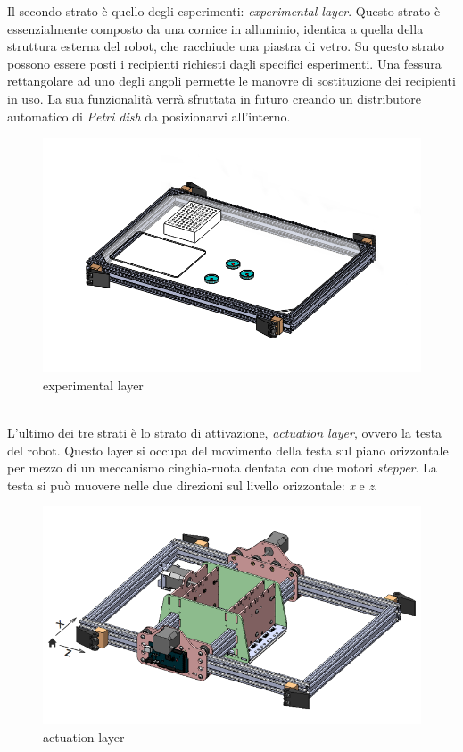 \pagebreak
Il secondo strato è quello degli esperimenti: \emph{experimental layer}. Questo strato è essenzialmente composto da una cornice in alluminio, identica a quella della struttura esterna del robot, che racchiude una piastra di vetro. Su questo strato possono essere posti i recipienti richiesti dagli specifici esperimenti. Una fessura rettangolare ad uno degli angoli permette le manovre di sostituzione dei recipienti in uso. La sua funzionalità verrà sfruttata in futuro creando un distributore automatico di  \emph{Petri dish} da posizionarvi all'interno.
	\begin{figure}[h]
	  \includegraphics[scale=0.40]{immagini/experiment_layer.png}
		\centering 
	\caption{experimental layer}
	\end{figure} 
\\L'ultimo dei tre strati è lo strato di attivazione, \emph{actuation layer}, ovvero la testa del robot.  Questo layer si occupa del movimento della testa sul piano orizzontale per mezzo di un meccanismo cinghia-ruota dentata con due motori \emph{stepper}. La testa si può muovere nelle due direzioni sul livello orizzontale: \emph{x} e \emph{z}.

	\begin{figure}[h]
	  \includegraphics[scale=0.30]{immagini/actuation_layer.png}
		\centering	
	 \caption{actuation layer}
	\end{figure}
\pagebreak

